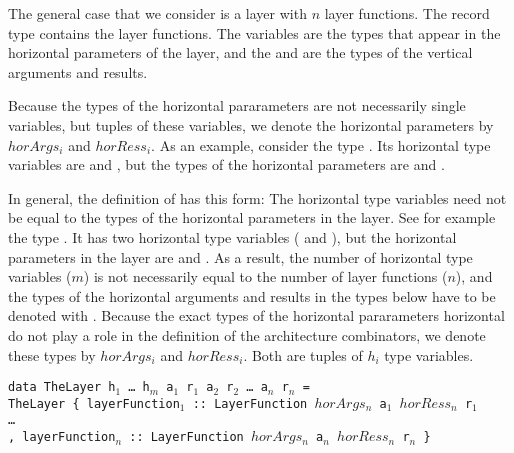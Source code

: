 

The general case that we consider is a layer with $n$ layer functions. The record type  contains the layer functions. The  variables are the types that appear in the horizontal parameters of the layer, and the  and  are the types of the vertical arguments and results. 

Because the types of the horizontal pararameters are not necessarily single  variables, but tuples of these variables, we denote the horizontal parameters by $horArgs_i$ and $horRess_i$. As an example, consider the type . Its horizontal  type variables are  and , but the types of the horizontal parameters are  and . 

In general, the definition of  has this form:
\bc
The horizontal type variables need not be equal to the types of the horizontal parameters in the layer. See for example the type . It has two horizontal type variables ( and ), but the horizontal parameters in the layer are  and . As a result, the number of horizontal type variables ($m$) is not necessarily equal to the number of layer functions ($n$), and the types of the horizontal arguments and results in the  types below have to be denoted with \p{(\dots)}. Because the exact types of the horizontal pararameters horizontal do not play a role in the definition of the architecture combinators, we denote these types by $horArgs_i$ and $horRess_i$. Both are tuples of $h_i$ type variables.  
\ec

\begin{small}
\begin{tabbing}
{\tt data Th}\={\tt eLayer h$_1$ \dots ~h$_m$ a$_1$ r$_1$ a$_2$ r$_2$ \dots ~a$_n$ r$_n$ = }\\
\> {\tt TheLayer~}\={\tt \{~layerFunction$_1$}\verb| :: |{\tt LayerFunction $horArgs_n$ a$_1$ $horRess_n$ r$_1$}\\
\>\> {\tt \dots }\\
\>\> {\tt , layerFunction$_n$}\verb| :: |{\tt LayerFunction $horArgs_n$ a$_n$ $horRess_n$ r$_n$ \}}\\
\end{tabbing}
\end{small}

